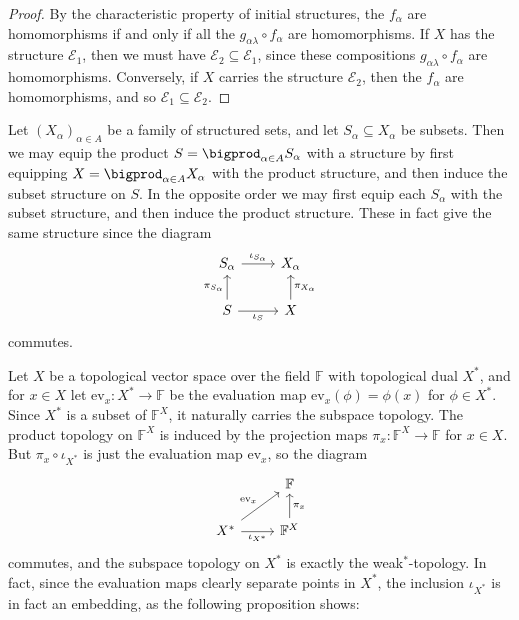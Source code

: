 \documentclass[article, a4paper, 11pt, oneside]{memoir}
\numberwithin{equation}{chapter}
\newcommand{\setF}{\mathbb{F}}
\newcommand{\ev}{\mathrm{ev}}
\newcommand{\calE}{\mathcal{E}}
\begin{document}
\begin{proof}
    By the characteristic property of initial structures, the $f_\alpha$ are homomorphisms if and only if all the $g_{\alpha\lambda} \circ f_\alpha$ are homomorphisms. If $X$ has the structure $\calE_1$, then we must have $\calE_2 \subseteq \calE_1$, since these compositions $g_{\alpha\lambda} \circ f_\alpha$ are homomorphisms. Conversely, if $X$ carries the structure $\calE_2$, then the $f_\alpha$ are homomorphisms, and so $\calE_1 \subseteq \calE_2$.
\end{proof}


\begin{examplebreak}
    Let $(X_\alpha)_{\alpha \in A}$ be a family of structured sets, and let $S_\alpha \subseteq X_\alpha$ be subsets. Then we may equip the product $S = \bigprod_{\alpha \in A} S_\alpha$ with a structure by first equipping $X = \bigprod_{\alpha \in A} X_\alpha$ with the product structure, and then induce the subset structure on $S$. In the opposite order we may first equip each $S_\alpha$ with the subset structure, and then induce the product structure. These in fact give the same structure since the diagram
    \begin{equation*}
        \begin{tikzcd}
            S_\alpha
                \ar[r, "\iota_{S_\alpha}"]
            & X_\alpha \\
            S  
                \ar[u, "\pi_{S_\alpha}"]
                \ar[r, "\iota_S", swap]
            & X
                \ar[u, "\pi_{X_\alpha}", swap]
        \end{tikzcd}
    \end{equation*}
    commutes.
\end{examplebreak}


\begin{examplebreak}
    Let $X$ be a topological vector space over the field $\setF$ with topological dual $X^*$, and for $x \in X$ let $\ev_x \colon X^* \to \setF$ be the evaluation map $\ev_x(\phi) = \phi(x)$ for $\phi \in X^*$. Since $X^*$ is a subset of $\setF^X$, it naturally carries the subspace topology. The product topology on $\setF^X$ is induced by the projection maps $\pi_x \colon \setF^X \to \setF$ for $x \in X$. But $\pi_x \circ \iota_{X^*}$ is just the evaluation map $\ev_x$, so the diagram
    \begin{equation*}
        \begin{tikzcd}
            & \setF \\
            X^*
                \ar[r, "\iota_{X^*}", swap]
                \ar[ru, "\ev_x"]
            & \setF^X
                \ar[u, "\pi_x", swap]
        \end{tikzcd}
    \end{equation*}
    commutes, and the subspace topology on $X^*$ is exactly the weak${}^*$-topology. In fact, since the evaluation maps clearly separate points in $X^*$, the inclusion $\iota_{X^*}$ is in fact an embedding, as the following proposition shows:
\end{examplebreak}
\end{document}

